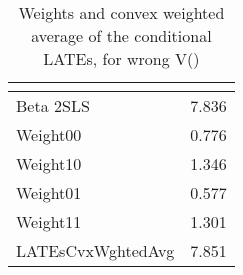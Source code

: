 \begin{table}[htbp]\centering
\caption{Weights and convex weighted average of the conditional LATEs, for wrong V()\label{tab:Angrist}}
\begin{tabular}{l*{1}{c}}
\hline\hline
            &\multicolumn{1}{c}{}\\
\hline
Beta 2SLS   &       7.836\\
\hline
Weight00    &       0.776\\
Weight10    &       1.346\\
Weight01    &       0.577\\
Weight11    &       1.301\\
LATEsCvxWghtedAvg&       7.851\\
\hline\hline
\end{tabular}
\end{table}
